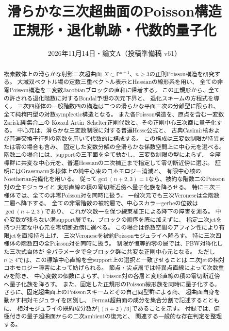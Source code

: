 \makeatletter
{}
\makeatother

\title{滑らかな三次超曲面のPoisson構造\\
\large 正規形・退化軌跡・代数的量子化}
\author{}
\date{2026年11月14日・論文A（投稿準備稿 v61）}

\maketitle
\begin{abstract}
複素数体上の滑らかな射影三次超曲面
$X\subset\mathbb P^{n+1}$、$n\ge3$の正則Poisson構造を研究する。
大域双ベクトル場の定数三重ベクトル表示とHessianの線形系を用い、
全ての非零Poisson構造を三変数Jacobianブロックの直和に帰着する。
この正規形から、全ての許される退化階数に対するBondal予想の次元下界と、
退化スキームの方程式を導く。
三次四様体の一般階数四の構造は二つの滑らかな平面三次の分離型に限られ、
全て純楕円型の対数symplectic構造となる。
また各Poisson構造を、原点を含む一変数Zariski開集合上の
Koszul Artin--Schelter正則代数と、その正則中心三次商に量子化する。
中心元は、滑らかな三変数制限に対する普遍Hesse公式と、
古典Casimir核および普遍交換子行列の階数を用いて代数的に構成する。
この構成は三変数制限が特異または零の場合も含み、
固定した変数分解の全滑らかな係数空間上に中心元を選べる。
階数二の場合には、supportの三平面を全て動かし、三変数制限の型によらず、
全座標群に共変な中心元を、普遍Hessianの二次補正まで指定して零切断近傍に選ぶ。
証明にはGrassmann多様体上の純中心束のコホモロジー消滅と、
有限中心核のNoetherian完備化を用いる。
従って$\gcd(n+2,3)=1$なら、被約な階数二のPoisson対の全モジュライと
変形直線の積の零切断近傍へ量子化族を降ろせる。
特に三次三様体では、全ての非零Poisson対を同時に扱う。
一般次元でも三次Veroneseは全階数二層へ降下する。
全ての非零階数の被約層で、中心スカラーgerbeの位数は$\gcd(n+2,3)$であり、
これが次数一を保つ線束補正による降下の障害を測る。
中心変数が残らない満support層でも、ブロックの順序を底に加えずに、
指定二次jetを持つ共変な中心元を零切断近傍に選べる。
この場合は係数空間のアフィン性により有限jetを直接持ち上げ、
三次Veroneseを被約Poissonモジュライへ降ろす。
特に三次四様体の階数四の全Poisson対を同時に扱う。
制限が恒等的零の層では、PBW対称化した三次式自体が
全パラメータで全ブロック群に共変な正則中心元となる。
ただし$n\ge4$では、この標準中心直線を全support上の選択と一致させることは
二次jetの相対コホモロジー障害によって妨げられる。
節点・尖点層では特異点直線によって次数重みを除き、
中心変数の個数によらず、Poisson対の各層と変形直線の積の零切断近傍へ量子化族を降ろす。
また、固定した正規形のPoisson線形族を同時に量子化する。
さらに、固定超曲面上のPoissonスキームとその自己同型群による商、
超曲面自身を動かす相対モジュライを区別し、
Fermat超曲面の成分を集合分割で記述するとともに、
相対モジュライの既約成分数が$\lfloor(n+2)/3\rfloor$であることを示す。
付録では、偏極付きの量子超曲面からの二次ambientの復元と、
関連する一般的な存在判定を整理する。
\end{abstract}

